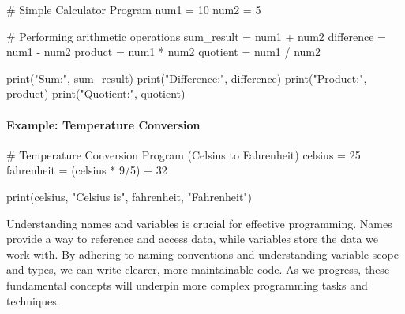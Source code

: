\documentclass[
  letterpaper,
  DIV=11,
  numbers=noendperiod]{scrreprt}
\let\oldparagraph\paragraph
\renewcommand{\paragraph}[1]{\oldparagraph{#1}\mbox{}}
\newenvironment{Shaded}{\begin{snugshade}}{\end{snugshade}}
\newcommand{\BuiltInTok}[1]{\textcolor[rgb]{0.00,0.23,0.31}{#1}}
\newcommand{\CommentTok}[1]{\textcolor[rgb]{0.37,0.37,0.37}{#1}}
\newcommand{\DecValTok}[1]{\textcolor[rgb]{0.68,0.00,0.00}{#1}}
\newcommand{\NormalTok}[1]{\textcolor[rgb]{0.00,0.23,0.31}{#1}}
\newcommand{\OperatorTok}[1]{\textcolor[rgb]{0.37,0.37,0.37}{#1}}
\newcommand{\StringTok}[1]{\textcolor[rgb]{0.13,0.47,0.30}{#1}}
\begin{document}
\begin{Shaded}
\begin{Highlighting}[]
\CommentTok{\# Simple Calculator Program}
\NormalTok{num1 }\OperatorTok{=} \DecValTok{10}
\NormalTok{num2 }\OperatorTok{=} \DecValTok{5}

\CommentTok{\# Performing arithmetic operations}
\NormalTok{sum\_result }\OperatorTok{=}\NormalTok{ num1 }\OperatorTok{+}\NormalTok{ num2}
\NormalTok{difference }\OperatorTok{=}\NormalTok{ num1 }\OperatorTok{{-}}\NormalTok{ num2}
\NormalTok{product }\OperatorTok{=}\NormalTok{ num1 }\OperatorTok{*}\NormalTok{ num2}
\NormalTok{quotient }\OperatorTok{=}\NormalTok{ num1 }\OperatorTok{/}\NormalTok{ num2}

\BuiltInTok{print}\NormalTok{(}\StringTok{"Sum:"}\NormalTok{, sum\_result)}
\BuiltInTok{print}\NormalTok{(}\StringTok{"Difference:"}\NormalTok{, difference)}
\BuiltInTok{print}\NormalTok{(}\StringTok{"Product:"}\NormalTok{, product)}
\BuiltInTok{print}\NormalTok{(}\StringTok{"Quotient:"}\NormalTok{, quotient)}
\end{Highlighting}
\end{Shaded}

\hypertarget{example-temperature-conversion}{%
\paragraph{Example: Temperature
Conversion}\label{example-temperature-conversion}}

\begin{Shaded}
\begin{Highlighting}[]
\CommentTok{\# Temperature Conversion Program (Celsius to Fahrenheit)}
\NormalTok{celsius }\OperatorTok{=} \DecValTok{25}
\NormalTok{fahrenheit }\OperatorTok{=}\NormalTok{ (celsius }\OperatorTok{*} \DecValTok{9}\OperatorTok{/}\DecValTok{5}\NormalTok{) }\OperatorTok{+} \DecValTok{32}

\BuiltInTok{print}\NormalTok{(celsius, }\StringTok{"Celsius is"}\NormalTok{, fahrenheit, }\StringTok{"Fahrenheit"}\NormalTok{)}
\end{Highlighting}
\end{Shaded}

Understanding names and variables is crucial for effective programming.
Names provide a way to reference and access data, while variables store
the data we work with. By adhering to naming conventions and
understanding variable scope and types, we can write clearer, more
maintainable code. As we progress, these fundamental concepts will
underpin more complex programming tasks and techniques.
\end{document}
